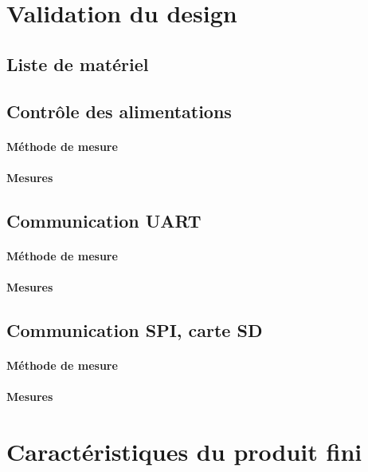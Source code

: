 \clearpage

\section{Validation du design} \label{sec:Validation-design}

\subsection{Liste de matériel} \label{ssec:Liste-materiel}

\subsection{Contrôle des alimentations} \label{ssec:Controle-alims}
\paragraph{Méthode de mesure}
\paragraph{Mesures}

\subsection{Communication UART} \label{ssec:Comm-UART}
\paragraph{Méthode de mesure}
\paragraph{Mesures}

\subsection{Communication SPI, carte SD} \label{ssec:Comm-SPI}
\paragraph{Méthode de mesure}
\paragraph{Mesures}

\section{Caractéristiques du produit fini} \label{sec:Carac-finis}